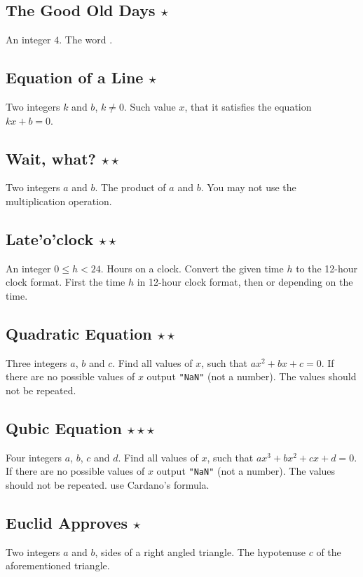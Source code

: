 \subsection{The Good Old Days $\star$}
\In
An integer $4$.
\Out
The word .

\subsection{Equation of a Line $\star$}
\In
Two integers $k$ and $b$, $k \neq 0$.
\Out
Such value $x$, that it satisfies the equation $kx+b=0$. 

\subsection{Wait, what? $\star\star$}
\In
Two integers $a$ and $b$.
\Out
The product of $a$ and $b$.
\Note
You may not use the multiplication operation.

\subsection{Late'o'clock $\star\star$}
\In An integer $0 \leq h < 24$. Hours on a clock.
\Note Convert the given time $h$ to the 12-hour clock format.
\Out First the time $h$ in 12-hour clock format, then  or 
depending on the time.

\subsection{Quadratic Equation $\star\star$}
\In
Three integers $a$, $b$ and $c$.
\Out
Find all values of $x$, such that $ax^2 + bx + c=0$. 
\Note
If there are no possible values of $x$ output \texttt{"NaN"} (not a number). 
The values should not be repeated.

\subsection{Qubic Equation $\star\star\star$}
\In
Four integers $a$, $b$, $c$ and $d$.
\Out
Find all values of $x$, such that $ax^3 + bx^2 + cx + d = 0$. 
\Note
If there are no possible values of $x$ output \texttt{"NaN"} (not a number). 
The values should not be repeated.
\Hint
use Cardano's formula.

\subsection{Euclid Approves $\star$}
\In
Two integers $a$ and $b$, sides of a right angled triangle.
\Out
The hypotenuse $c$ of the aforementioned triangle.

